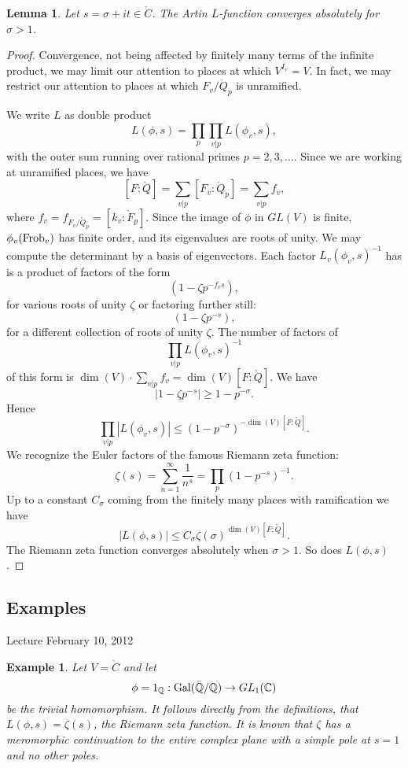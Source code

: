 \documentclass{amsart}
\newtheorem{lemma}[equation]{Lemma}
\newtheorem{example}[exercise]{Example}
\def\abs#1{{|#1|}}
\def\CC{\ring{C}}
\def\oG{\op{Gal}}
\begin{document}
\begin{lemma} Let $s = \sigma+i t\in\CC$.  The Artin $L$-function converges
absolutely for $\sigma >1$.
\end{lemma}

\begin{proof}  Convergence, not being affected by finitely many terms of the
infinite product, we
may limit our attention to places at which $V^{I_v}=V$.  In fact, we may restrict
our attention to places at which $F_v/\ring{Q}_p$ is unramified.

We write $L$ as double product
\[
L(\phi,s) = \prod_p \prod_{v|p} L(\phi_v,s),
\]
with the outer sum running over rational primes $p=2,3,\ldots$.
Since we are working at unramified places, we have
\[
[F:\ring{Q}] = \sum_{v|p} [F_v:\ring{Q}_p] = \sum_{v|p} f_v,
\]
where $f_v = f_{F_v/\ring{Q}_p}=[k_v:\ring{F}_p]$.
Since the image of $\phi$ in $GL(V)$ is finite, $\phi_v({\operatorname{Frob}}_v)$ has
finite order, and its eigenvalues are roots of unity.  We may compute the
determinant by a basis of eigenvectors.  Each factor $L_v(\phi_v,s)^{-1}$ has
is a product of factors of the form
\[
(1 - \zeta p^{-f_v s}),
\]
for various roots of unity $\zeta$
or factoring further still:
\[
(1 - \zeta p^{-s}),
\]
for a different collection of roots of unity $\zeta$.
The number of factors of 
\[
\prod_{v|p} L(\phi_v,s)^{-1}
\]
of this form is $\dim(V)\cdot\sum_{v|p} f_v = \dim(V)[F:\ring{Q}]$.
We have
\[
\abs{1 - \zeta p^{-s}} \ge 1 - p^{-\sigma}.
\]
Hence
\[
\prod_{v|p} \abs{L(\phi_v,s)} \le (1 - p^{-\sigma})^{-\dim(V)[F:\ring{Q}]}.
\]
We recognize the Euler factors of the famous Riemann zeta function:
\[
\zeta(s) = \sum_{n=1}^\infty \frac{1}{n^s} = \prod_p (1-p^{-s})^{-1}.
\]
Up to a constant $C_\sigma$ coming from the finitely many
places with ramification we have
\[
\abs{L(\phi,s)} \le C_\sigma \zeta(\sigma)^{\dim(V)[F:\ring{Q}]}.
\]
The Riemann zeta function converges absolutely when $\sigma>1$.  
So does $L(\phi,s)$.
\end{proof}

\subsection{Examples}

Lecture February 10, 2012

\begin{example} Let $V=\CC$ and let 
\[
\phi={1}_{\ring{Q}}:\oG(\bar{\ring{Q}}/\ring{Q})\to GL_1(\CC)
\]
be the trivial homomorphism.  It follows directly from the definitions,
that $L(\phi,s) = \zeta(s)$, the Riemann zeta function.  It is known
that $\zeta$ has a meromorphic continuation to the entire complex plane
with a simple pole at $s=1$ and no other poles.
\end{example}
\end{document}
